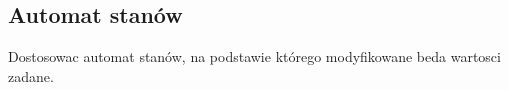 \subsection{Automat stanów}
\label{lab:zad11}



\ifdefined\CompileFigures
%    
\fi

Dostosowac automat stanów, na podstawie którego modyfikowane beda wartosci zadane.

\newpage
